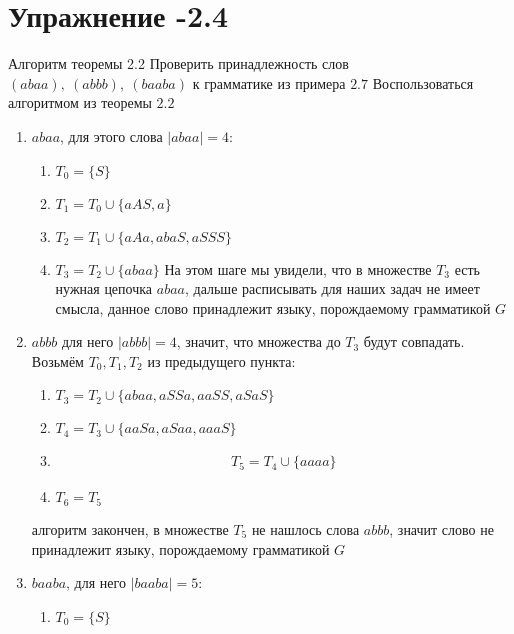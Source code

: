 \documentclass[12pt, a4paper, oneside]{memoir}
\begin{document}
\section*{Упражнение -2.4}
\begin{solution}
    {Алгоритм теоремы 2.2}
    {Проверить принадлежность слов $(abaa),\ (abbb),\ (baaba) $ к грамматике из примера $2.7$}
    {Воспользоваться алгоритмом из теоремы $2.2$}
    \begin{enumerate}
        \item $abaa$, для этого слова $|abaa| = 4$:
              \begin{enumerate}
                  \item $T_0 = \{S\}$
                  \item $T_1 = T_0 \cup \{aAS, a\}$
                  \item $T_2 = T_1 \cup \{aAa, abaS, aSSS\}$
                  \item $T_3 = T_2 \cup \{abaa\}$ На этом шаге мы увидели, что в множестве $T_3$ есть нужная цепочка $abaa$, дальше расписывать для наших задач не имеет смысла, данное слово принадлежит языку, порождаемому грамматикой $G$
              \end{enumerate}
        \item $abbb$ для него $|abbb| = 4$, значит, что множества до $T_3$ будут совпадать. Возьмём $T_0, T_1, T_2$ из предыдущего пункта:
              \begin{enumerate}
                  \item $T_3 = T_2 \cup \{abaa, aSSa, aaSS, aSaS\}$
                  \item $T_4 = T_3 \cup\{aaSa, aSaa, aaaS\}$
                  \item \begin{gather*}
                            T_5 = T_4 \cup \{aaaa\}
                        \end{gather*}
                  \item $T_6 = T_5$
              \end{enumerate}
              алгоритм закончен, в множестве $T_5$ не нашлось слова $abbb$, значит слово не принадлежит языку, порождаемому грамматикой $G$
        \item $baaba$, для него $|baaba| = 5$:
        \begin{enumerate}
            \item $T_0 = \{S\}$
        \end{enumerate}
    \end{enumerate}

\end{solution}
\end{document}
